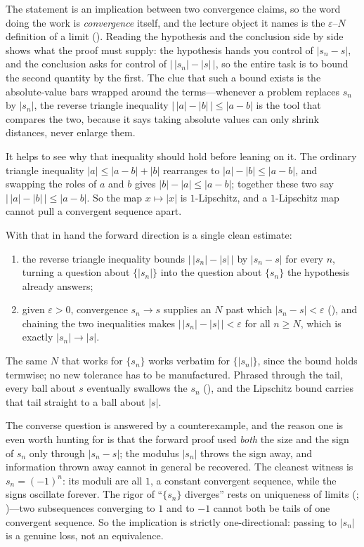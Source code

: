 \documentclass[main.tex]{subfiles}
\begin{document}
\begin{Reflection}
The statement is an implication between two convergence claims, so the word doing the work is
\emph{convergence} itself, and the lecture object it names is the $\varepsilon$--$N$ definition of a
limit (). Reading the hypothesis and the conclusion side by side shows what the proof must
supply: the hypothesis hands you control of $|s_n-s|$, and the conclusion asks for control of
$\bigl|\,|s_n|-|s|\,\bigr|$, so the entire task is to bound the second quantity by the first. The clue
that such a bound exists is the absolute-value bars wrapped around the terms---whenever a problem
replaces $s_n$ by $|s_n|$, the reverse triangle inequality $\bigl|\,|a|-|b|\,\bigr|\le|a-b|$ is the tool
that compares the two, because it says taking absolute values can only shrink distances, never enlarge
them.

It helps to see why that inequality should hold before leaning on it. The ordinary triangle inequality
$|a|\le|a-b|+|b|$ rearranges to $|a|-|b|\le|a-b|$, and swapping the roles of $a$ and $b$ gives
$|b|-|a|\le|a-b|$; together these two say $\bigl|\,|a|-|b|\,\bigr|\le|a-b|$. So the map $x\mapsto|x|$ is
$1$-Lipschitz, and a $1$-Lipschitz map cannot pull a convergent sequence apart.

With that in hand the forward direction is a single clean estimate:
\begin{enumerate}[leftmargin=1.7em,itemsep=3pt,topsep=2pt,label=\textnormal{(\arabic*)}]
  \item the reverse triangle inequality bounds $\bigl|\,|s_n|-|s|\,\bigr|$ by $|s_n-s|$ for every $n$,
        turning a question about $\{|s_n|\}$ into the question about $\{s_n\}$ the hypothesis already
        answers;
  \item given $\varepsilon>0$, convergence $s_n\to s$ supplies an $N$ past which $|s_n-s|<\varepsilon$
        (), and chaining the two inequalities makes $\bigl|\,|s_n|-|s|\,\bigr|<\varepsilon$
        for all $n\ge N$, which is exactly $|s_n|\to|s|$.
\end{enumerate}
The same $N$ that works for $\{s_n\}$ works verbatim for $\{|s_n|\}$, since the bound holds termwise; no
new tolerance has to be manufactured. Phrased through the tail, every ball about $s$ eventually swallows
the $s_n$ (), and the Lipschitz bound carries that tail
straight to a ball about $|s|$.

The converse question is answered by a counterexample, and the reason one is even worth hunting for is
that the forward proof used \emph{both} the size and the sign of $s_n$ only through $|s_n-s|$; the modulus
$|s_n|$ throws the sign away, and information thrown away cannot in general be recovered. The cleanest
witness is $s_n=(-1)^n$: its moduli are all $1$, a constant convergent sequence, while the signs
oscillate forever. The rigor of ``$\{s_n\}$ diverges'' rests on uniqueness of limits
(; )---two subsequences converging
to $1$ and to $-1$ cannot both be tails of one convergent sequence. So the implication is strictly
one-directional: passing to $|s_n|$ is a genuine loss, not an equivalence.


\end{Reflection}
\end{document}
